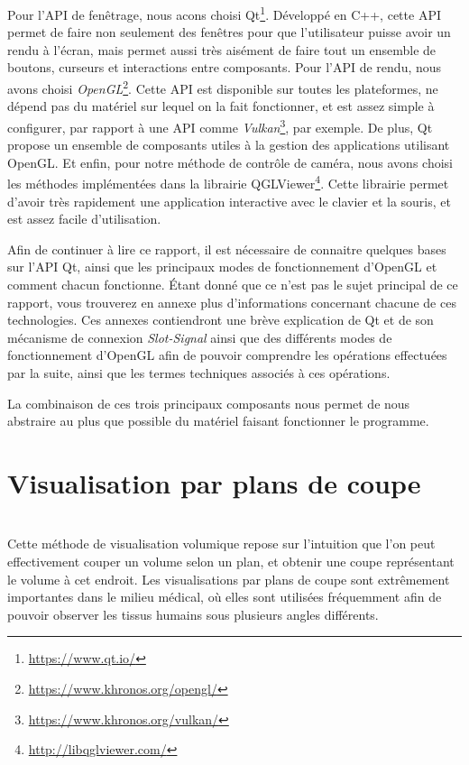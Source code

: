 {	Pour l'API de fenêtrage, nous acons choisi Qt\footnote{\url{https://www.qt.io/}}. Développé en C++, cette API permet de faire non seulement des fenêtres pour que l'utilisateur puisse avoir un rendu à l'écran, mais permet aussi très aisément de faire tout un ensemble de boutons, curseurs et interactions entre composants. Pour l'API de rendu, nous avons choisi \textit{OpenGL}\footnote{\url{https://www.khronos.org/opengl/}}. Cette API est disponible sur toutes les plateformes, ne dépend pas du matériel sur lequel on la fait fonctionner, et est assez simple à configurer, par rapport à une API comme \textit{Vulkan}\footnote{\url{https://www.khronos.org/vulkan/}}, par exemple. De plus, Qt propose un ensemble de composants utiles à la gestion des applications utilisant OpenGL. Et enfin, pour notre méthode de contrôle de caméra, nous avons choisi les méthodes implémentées dans la librairie QGLViewer\footnote{\url{http://libqglviewer.com/}}. Cette librairie permet d'avoir très rapidement une application interactive avec le clavier et la souris, et est assez facile d'utilisation.\par
	Afin de continuer à lire ce rapport, il est nécessaire de connaitre quelques bases sur l'API Qt, ainsi que les principaux modes de fonctionnement d'OpenGL et comment chacun fonctionne. Étant donné que ce n'est pas le sujet principal de ce rapport, vous trouverez en annexe plus d'informations concernant chacune de ces technologies. Ces annexes contiendront une brève explication de Qt et de son mécanisme de connexion \textit{Slot-Signal} ainsi que des différents modes de fonctionnement d'OpenGL afin de pouvoir comprendre les opérations effectuées par la suite, ainsi que les termes techniques associés à ces opérations.\par
	La combinaison de ces trois principaux composants nous permet de nous abstraire au plus que possible du matériel faisant fonctionner le programme.\par

	\section{Visualisation par plans de coupe}
	{
		\\

		Cette méthode de visualisation volumique repose sur l'intuition que l'on peut effectivement couper un volume selon un plan, et obtenir une coupe représentant le volume à cet endroit. Les visualisations par plans de coupe sont extrêmement importantes dans le milieu médical, où elles sont utilisées fréquemment afin de pouvoir observer les tissus humains sous plusieurs angles différents.\par

}}
